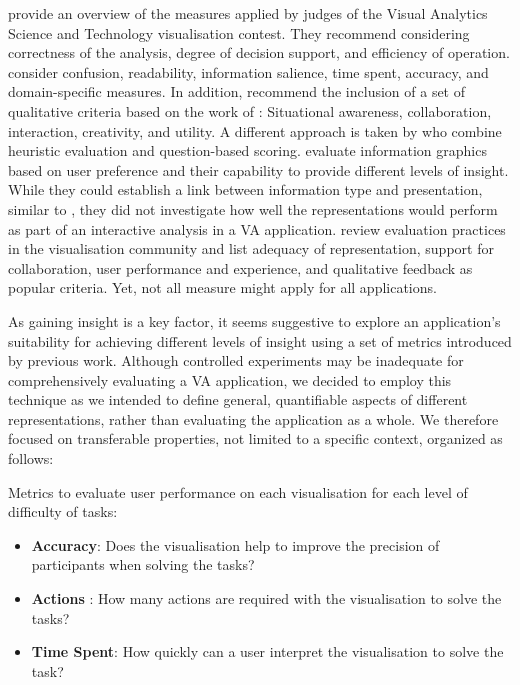 \documentclass[final,5p,times,twocolumn,authoryear]{elsarticle}
\begin{document}
\cite{laskowski_framework_2007} provide an overview of the measures applied by judges of the Visual Analytics Science and Technology visualisation contest. They recommend considering correctness of the analysis, degree of decision support, and efficiency of operation. \cite{lex_caleydo:_2010} consider confusion, readability, information salience, time spent, accuracy, and domain-specific measures. In addition, \cite{wang_two-stage_2011} recommend the inclusion of a set of qualitative criteria based on the work of \cite{scholtz_beyond_2006}: Situational awareness, collaboration, interaction, creativity, and utility. A different approach is taken by  \cite{hearst_evaluating_2016} who combine heuristic evaluation and question-based scoring. \cite{yang_understand_2014} evaluate information graphics based on user preference and their capability to provide different levels of insight. While they could establish a link between information type and presentation, similar to  \cite{Wongsuphasawat2016}, they did not investigate how well the representations would perform as part of an interactive analysis in a VA application. \cite{isenberg_systematic_2013} review evaluation practices in the visualisation community and list adequacy of representation, support for collaboration, user performance and experience, and qualitative feedback as popular criteria. Yet, not all measure might apply for all applications.

As gaining insight is a key factor, it seems suggestive to explore an application's suitability for achieving different levels of insight using a set of metrics introduced by previous work. Although controlled experiments may be inadequate \citep{Perer:2008:ISV:1357054.1357101} for comprehensively evaluating a VA application, we decided to employ this technique as we intended to define general, quantifiable aspects of different representations, rather than evaluating the application as a whole. We therefore focused on transferable properties, not limited to a specific context, organized as follows:

Metrics to evaluate user performance on each visualisation for each level of difficulty of tasks:

\begin{itemize}
  \item \textbf{Accuracy}: Does the visualisation help to improve the precision of participants when solving the tasks?
  \item \textbf{Actions} : How many actions are required with the visualisation to solve the tasks?
  \item \textbf{Time Spent}: How quickly can a user interpret the visualisation to solve the task?  
\end{itemize}
\end{document}
